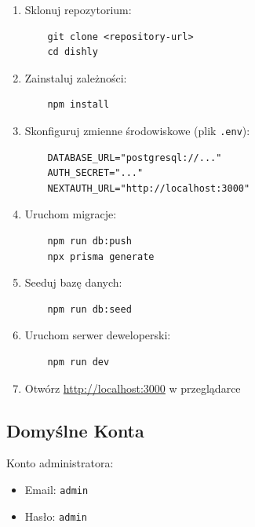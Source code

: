 ﻿\documentclass[12pt,a4paper,utf-8]{article}
\begin{document}
\begin{enumerate}
    \item Sklonuj repozytorium:
    \begin{verbatim}
    git clone <repository-url>
    cd dishly
    \end{verbatim}
    
    \item Zainstaluj zależności:
    \begin{verbatim}
    npm install
    \end{verbatim}
    
    \item Skonfiguruj zmienne środowiskowe (plik \texttt{.env}):
    \begin{verbatim}
    DATABASE_URL="postgresql://..."
    AUTH_SECRET="..."
    NEXTAUTH_URL="http://localhost:3000"
    \end{verbatim}
    
    \item Uruchom migracje:
    \begin{verbatim}
    npm run db:push
    npx prisma generate
    \end{verbatim}
    
    \item Seeduj bazę danych:
    \begin{verbatim}
    npm run db:seed
    \end{verbatim}
    
    \item Uruchom serwer deweloperski:
    \begin{verbatim}
    npm run dev
    \end{verbatim}
    
    \item Otwórz \href{http://localhost:3000}{http://localhost:3000} w przeglądarce
\end{enumerate}

\subsection{Domyślne Konta}

Konto administratora:
\begin{itemize}
    \item Email: \texttt{admin}
    \item Hasło: \texttt{admin}
\end{itemize}

\newpage
\end{document}
